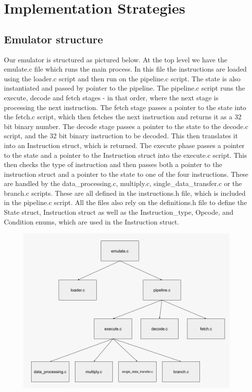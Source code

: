 \documentclass[11pt]{article}
\begin{document}
  \section*{Implementation Strategies}

  \subsection*{Emulator structure}

Our emulator is structured as pictured below. At the top level we have the emulate.c file which runs the main process. In this file the instructions are loaded using the loader.c script and then run on the pipeline.c script. The state is also instantiated and passed by pointer to the pipeline. The pipeline.c script runs the execute, decode and fetch stages - in that order, where the next stage is processing the next instruction. The fetch stage passes a pointer to the state into the fetch.c script, which then fetches the next instruction and returns it as a 32 bit binary number. The decode stage passes a pointer to the state to the decode.c script, and the 32 bit binary instruction to be decoded. This then translates it into an Instruction struct, which is returned. The execute phase passes a pointer to the state and a pointer to the Instruction struct into the execute.c script. This then checks the type of instruction and then passes both a pointer to the instruction struct and a pointer to the state to one of the four instructions. These are handled by the data_processing.c, multiply.c, single_data_transfer.c or the branch.c scripts. These are all defined in the instructions.h file, which is included in the pipeline.c script. All the files also rely on the definitions.h file to define the State struct, Instruction struct as well as the Instruction_type, Opcode, and Condition enums, which are used in the Instruction struct.

 \begin{figure}[h]
 \includegraphics[scale=0.4]{emulator_structure}
 \centering
 \end{figure}

  
\end{document}
